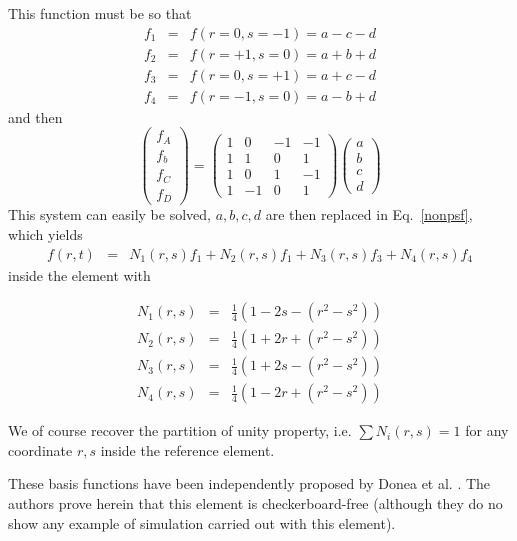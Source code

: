 This function must be so that 
\begin{eqnarray}
f_1 &=& f(r=0 ,s=-1) = a -c -d \\
f_2 &=& f(r=+1,s=0)  = a +b +d \\
f_3 &=& f(r=0 ,s=+1) = a +c -d \\
f_4 &=& f(r=-1,s=0)  = a -b +d 
\end{eqnarray}
and then 
\[
\left(
\begin{array}{c}
f_A \\ f_b \\ f_C \\ f_D
\end{array}
\right)
=
\left(
\begin{array}{cccc}
1 &0 &-1 &-1 \\
1 &1 &0 &1 \\
1 &0 &1 &-1 \\
1 &-1 &0 &1
\end{array}
\right)
\left(
\begin{array}{c}
a \\ b \\ c \\ d
\end{array}
\right)
\]
This system can easily be solved, $a,b,c,d$ are then replaced in Eq.~\eqref{nonpsf},
which yields 
\begin{eqnarray}
f(r,t) &=& N_1(r,s)f_1 +N_2(r,s)f_1 + N_3(r,s)f_3 +N_4(r,s)f_4
\end{eqnarray}
inside the element with
\begin{mdframed}[backgroundcolor=blue!5]
\begin{eqnarray}
N_1(r,s) &=& \frac{1}{4} (1-2s-(r^2-s^2)) \nonumber\\
N_2(r,s) &=& \frac{1}{4} (1+2r+(r^2-s^2)) \nonumber\\
N_3(r,s) &=& \frac{1}{4} (1+2s-(r^2-s^2)) \nonumber\\
N_4(r,s) &=& \frac{1}{4} (1-2r+(r^2-s^2)) \nonumber
\end{eqnarray}
\end{mdframed}
We of course recover the partition of unity property, i.e. $\sum N_i(r,s)=1$ for any coordinate $r,s$ inside 
the reference element.

\begin{remark}
These basis functions have been independently proposed by Donea et al. \cite{dogm81}. The authors
prove herein that this element is checkerboard-free (although they do no show any example
of simulation carried out with this element).
\end{remark}

